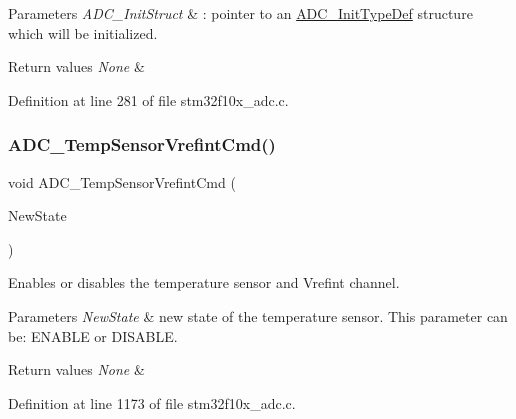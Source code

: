 \begin{DoxyParams}{Parameters}
{\em A\+D\+C\+\_\+\+Init\+Struct} & \+: pointer to an \hyperlink{struct_a_d_c___init_type_def}{A\+D\+C\+\_\+\+Init\+Type\+Def} structure which will be initialized. \\
\hline
\end{DoxyParams}

\begin{DoxyRetVals}{Return values}
{\em None} & \\
\hline
\end{DoxyRetVals}


Definition at line 281 of file stm32f10x\+\_\+adc.\+c.

\mbox{\label{group___a_d_c___private___functions_ga848682e2d7d3de9f8cf03ffa4c11f0b5}} 
\subsubsection{\texorpdfstring{A\+D\+C\+\_\+\+Temp\+Sensor\+Vrefint\+Cmd()}{ADC\_TempSensorVrefintCmd()}}
{\footnotesize\ttfamily void A\+D\+C\+\_\+\+Temp\+Sensor\+Vrefint\+Cmd (\begin{DoxyParamCaption}\item[{\hyperlink{group___exported__types_gac9a7e9a35d2513ec15c3b537aaa4fba1}{Functional\+State}}]{New\+State }\end{DoxyParamCaption})}



Enables or disables the temperature sensor and Vrefint channel. 


\begin{DoxyParams}{Parameters}
{\em New\+State} & new state of the temperature sensor. This parameter can be\+: E\+N\+A\+B\+LE or D\+I\+S\+A\+B\+LE. \\
\hline
\end{DoxyParams}

\begin{DoxyRetVals}{Return values}
{\em None} & \\
\hline
\end{DoxyRetVals}


Definition at line 1173 of file stm32f10x\+\_\+adc.\+c.

